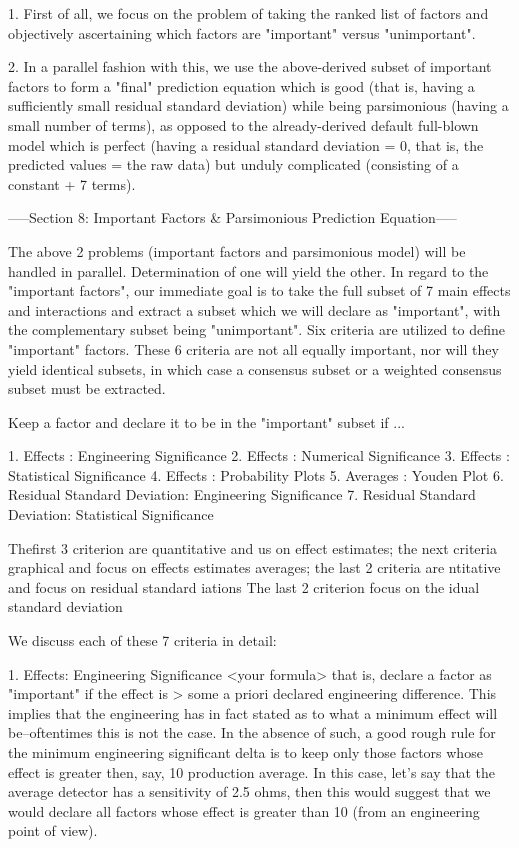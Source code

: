 1. First of all, we focus on the problem of taking
   the ranked list of factors and objectively
   ascertaining which factors are "important"
   versus "unimportant".

2. In a parallel fashion with this, we use the
   above-derived subset of important factors to
   form a "final" prediction equation which is
   good (that is, having a sufficiently small
   residual standard deviation) while being
   parsimonious (having a small number of terms),
   as opposed to the already-derived default
   full-blown model which is perfect (having a
   residual standard deviation = 0, that is, the
   predicted values = the raw data) but unduly
   complicated (consisting of a constant + 7
   terms).

-----Section 8: Important Factors & Parsimonious Prediction Equation-----

The above 2 problems (important factors and
parsimonious model) will be handled in parallel.
Determination of one will yield the other.  In
regard to the "important factors", our immediate
goal is to take the full subset of 7 main effects
and interactions and extract a subset which we
will declare as "important", with the
complementary subset being "unimportant".  Six
criteria are utilized to define "important"
factors.  These 6 criteria are not all equally
important, nor will they yield identical subsets,
in which case a consensus subset or a weighted
consensus subset must be extracted.

Keep a factor and declare it to be in the
"important" subset if ...

   1. Effects                    : Engineering Significance
   2. Effects                    : Numerical Significance
   3. Effects                    : Statistical Significance
   4. Effects                    : Probability Plots
   5. Averages                   : Youden Plot
   6. Residual Standard Deviation: Engineering Significance
   7. Residual Standard Deviation: Statistical Significance

Thefirst 3 criterion are quantitative and us on
   effect estimates; the next criteria graphical
   and focus on effects estimates averages; the
   last 2 criteria are ntitative and focus on
   residual standard iations The last 2 criterion
   focus on the idual standard deviation

We discuss each of these 7 criteria in detail:

1. Effects: Engineering Significance
   <your formula>
   that is, declare a factor as "important" if
   the effect is > some a priori declared
   engineering difference.  This implies that the
   engineering has in fact stated as to what a
   minimum effect will be--oftentimes this is not
   the case.  In the absence of such, a good rough
   rule for the minimum engineering significant
   delta is to keep only those factors whose
   effect is greater then, say, 10%
   production average.  In this case, let's say
   that the average detector has a sensitivity of
   2.5 ohms, then this would suggest that we would
   declare all factors whose effect is greater
   than 10%
   (from an engineering point of view).

